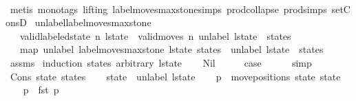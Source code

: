 \begin{isabellebody}
\ \ \ \ \isamarkupfalse%
\ {\isacharparenleft}metis\ {\isacharparenleft}mono{\isacharunderscore}tags{\isacharcomma}\ lifting{\isacharparenright}\ label{\isacharunderscore}moves{\isacharunderscore}max{\isacharunderscore}stone{\isachardot}simps{\isacharparenleft}{}{\isacharparenright}\ prod{\isachardot}collapse\ prod{\isachardot}simps{\isacharparenleft}{}{\isacharparenright}\ set{\isacharunderscore}ConsD{\isacharparenright}\isanewline
{}\isamarkupfalse%
%
\endisatagproof
{\isafoldproof}%
%
\isadelimproof
\isanewline
%
\endisadelimproof
\isanewline
{}\isamarkupfalse%
\ unlabel{\isacharunderscore}label{\isacharunderscore}moves{\isacharunderscore}max{\isacharunderscore}stone{\isacharcolon}\isanewline
\ \ \ {\isachardoublequoteopen}valid{\isacharunderscore}labeled{\isacharunderscore}state\ n\ l{\isacharunderscore}state{\isachardoublequoteclose}\ \ {\isachardoublequoteopen}valid{\isacharunderscore}moves\ n\ {\isacharparenleft}unlabel\ l{\isacharunderscore}state\ {\isacharhash}\ states{\isacharparenright}{\isachardoublequoteclose}\isanewline
\ \ \ {\isachardoublequoteopen}map\ unlabel\ {\isacharparenleft}label{\isacharunderscore}moves{\isacharunderscore}max{\isacharunderscore}stone\ l{\isacharunderscore}state\ states{\isacharparenright}\ {\isacharequal}\ unlabel\ l{\isacharunderscore}state\ {\isacharhash}\ states{\isachardoublequoteclose}\isanewline
%
\isadelimproof
\ \ %
\endisadelimproof
%
\isatagproof
{}\isamarkupfalse%
\ assms\isanewline
{}\isamarkupfalse%
\ {\isacharparenleft}induction\ states\ arbitrary{\isacharcolon}\ l{\isacharunderscore}state{\isacharparenright}\isanewline
\ \ \isamarkupfalse%
\ Nil\isanewline
\ \ \isamarkupfalse%
\ \isamarkupfalse%
\ {\isacharquery}case\isanewline
\ \ \ \ \isamarkupfalse%
\ simp\isanewline
{}\isamarkupfalse%
\isanewline
\ \ \isamarkupfalse%
\ {\isacharparenleft}Cons\ state{\isacharprime}\ states{\isacharparenright}\isanewline
\ \ \isamarkupfalse%
\ {\isacharquery}state\ {\isacharequal}\ {\isachardoublequoteopen}unlabel\ l{\isacharunderscore}state{\isachardoublequoteclose}\isanewline
\ \ \isamarkupfalse%
\ {\isacharquery}p\ {\isacharequal}\ {\isachardoublequoteopen}move{\isacharunderscore}positions\ {\isacharquery}state\ state{\isacharprime}{\isachardoublequoteclose}\isanewline
\ \ \isamarkupfalse%
\ {\isacharquery}p{}\ {\isacharequal}\ {\isachardoublequoteopen}fst\ {\isacharquery}p{\isachardoublequoteclose}\isanewline

\end{isabellebody}
